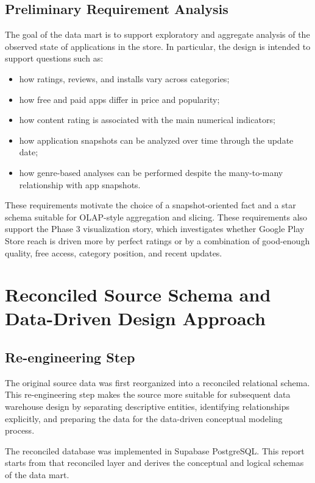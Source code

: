 \documentclass[11pt,a4paper]{article}
\newcommand{\dbms}{Supabase PostgreSQL}
\begin{document}
\subsection{Preliminary Requirement Analysis}
The goal of the data mart is to support exploratory and aggregate analysis of the observed state of applications in the store. In particular, the design is intended to support questions such as:
\begin{itemize}[leftmargin=1.5em]
    \item how ratings, reviews, and installs vary across categories;
    \item how free and paid apps differ in price and popularity;
    \item how content rating is associated with the main numerical indicators;
    \item how application snapshots can be analyzed over time through the update date;
    \item how genre-based analyses can be performed despite the many-to-many relationship with app snapshots.
\end{itemize}

These requirements motivate the choice of a snapshot-oriented fact and a star schema suitable for OLAP-style aggregation and slicing. These requirements also support the Phase 3 visualization story, which investigates whether Google Play Store reach is driven more by perfect ratings or by a combination of good-enough quality, free access, category position, and recent updates.

\section{Reconciled Source Schema and Data-Driven Design Approach}

\subsection{Re-engineering Step}
The original source data was first reorganized into a reconciled relational schema. This re-engineering step makes the source more suitable for subsequent data warehouse design by separating descriptive entities, identifying relationships explicitly, and preparing the data for the data-driven conceptual modeling process.

The reconciled database was implemented in \dbms. This report starts from that reconciled layer and derives the conceptual and logical schemas of the data mart.
\end{document}

